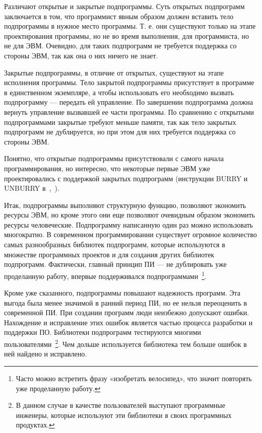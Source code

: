 Различают открытые и закрытые подпрограммы. Суть открытых подпрограмм заключается в том, что программист явным образом должен вставить тело подпрограммы в нужное место программы. Т. е. они существуют только на этапе проектирования программы, но не во время выполнения, для программиста, но не для ЭВМ. Очевидно, для таких подпрограмм не требуется поддержка со стороны ЭВМ, так как она о них ничего не знает.

Закрытые подпрограммы, в отличие от открытых, существуют на этапе исполнения программы. Тело закрытой подпрограммы присутствует в программе в единственном экземпляре, а чтобы использовать его необходимо вызвать подпрограмму — передать ей управление. По завершении подпрограмма должна вернуть управление вызвавшей ее части программы. По сравнению с открытыми подпрограммами закрытые требуют меньше памяти, так как тело закрытых подпрограмм не дублируется, но при этом для них требуется поддержка со стороны ЭВМ.

Понятно, что открытые подпрограммы присутствовали с самого начала программирования, но интересно, что некоторые первые ЭВМ уже проектировались с поддержкой закрытых подпрограмм (инструкции BURRY и UNBURRY в~\cite{Turing},~\cite{Dijkstra:1972:HP}).

Итак, подпрограммы выполняют структурную функцию, позволяют экономить ресурсы ЭВМ, но кроме этого они еще позволяют очевидным образом экономить ресурсы человеческие. Подпрограмму написанную один раз можно использовать многократно. В современном программировании существует огромное количество самых разнообразных библиотек подпрограмм, которые используются в множестве программных проектов и для создания других библиотек подпрограмм. Фактически, главный принцип ПИ — не дублировать уже проделанную работу, впервые поддерживался подпрограммами~\footnote{Часто можно встретить фразу «изобретать велосипед», что значит повторять уже проделанную работу.}.

Кроме уже сказанного, подпрограммы повышают надежность программ. Эта выгода была менее значимой в ранний период ПИ, но ее нельзя переоценить в современной ПИ. При создании программ люди неизбежно допускают ошибки. Нахождение и исправление этих ошибок является частью процесса разработки и поддержки ПО. Библиотеки подпрограмм тестируются многими пользователями~\footnote{В данном случае в качестве пользователей выступают программные инженеры, которые используют эти библиотеки в своих программных продуктах.}. Чем дольше используется библиотека тем больше ошибок в ней найдено и исправлено.

